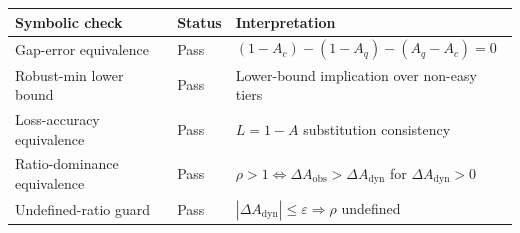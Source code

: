 \begin{tabular}{lll}
\hline
Symbolic check & Status & Interpretation \\
\hline
Gap-error equivalence & Pass & $(1-A_c)-(1-A_q)-(A_q-A_c)=0$ \\
Robust-min lower bound & Pass & Lower-bound implication over non-easy tiers \\
Loss-accuracy equivalence & Pass & $L=1-A$ substitution consistency \\
Ratio-dominance equivalence & Pass & $\rho>1 \Leftrightarrow \Delta A_{\mathrm{obs}}>\Delta A_{\mathrm{dyn}}$ for $\Delta A_{\mathrm{dyn}}>0$ \\
Undefined-ratio guard & Pass & $|\Delta A_{\mathrm{dyn}}|\le\varepsilon \Rightarrow \rho$ undefined \\
\hline
\end{tabular}
